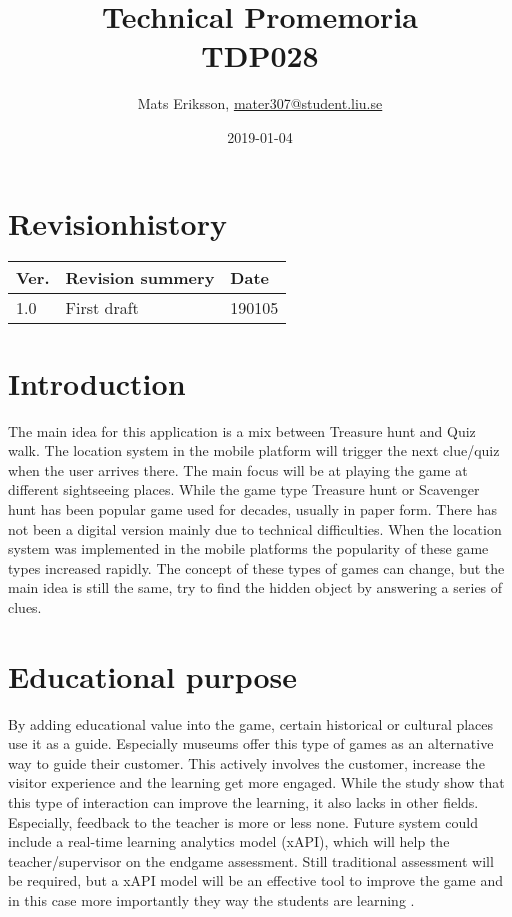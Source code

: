 \documentclass{TDP003mall}
\author{Mats Eriksson, \url{mater307@student.liu.se}}
\title{Technical Promemoria \\ TDP028}
\date{2019-01-04}
\begin{document}
\projectpage
\section{Revisionhistory}
\begin{table}[!h]
\begin{tabularx}{\linewidth}{|l|X|l|}
\hline
Ver. & Revision summery & Date \\\hline
1.0 & First draft & 190105 \\\hline
\end{tabularx}
\end{table}

\section{Introduction}
The main idea for this application is a mix between Treasure hunt and Quiz walk. The location
system in the mobile platform will trigger the next clue/quiz when the user arrives there.
The main focus will be at playing the game at different sightseeing places.
While the game type Treasure hunt or Scavenger hunt has been popular game
used for decades, usually in paper form. There has not been a digital version mainly
due to technical difficulties. When the location system was implemented in the mobile
platforms the popularity of these game types increased rapidly. The concept of these types of games
can change, but the main idea is still the same, try to find the hidden object by answering
a series of clues.

\section{Educational purpose}
By adding educational value into the game, certain historical or cultural places use
it as a guide. Especially museums offer this type of games as an alternative way to guide their
customer. This actively involves the customer, increase the visitor experience and the learning get
more engaged\cite{daphne15}.
While the study show that this type of interaction can improve the learning, it also lacks
in other fields. Especially, feedback to the teacher is more or less none. Future system
could include a real-time learning analytics model (xAPI), which will help the teacher/supervisor on
the endgame assessment. Still traditional assessment will be required, but a xAPI model will
be an effective tool to improve the game and in this case more importantly they way the students
are learning \cite{victor18}.
\end{document}
